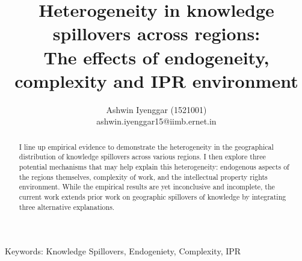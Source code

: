 \documentclass[12pt]{article}
\begin{document}
\title{\LARGE Heterogeneity in knowledge spillovers across regions:\\ \Large The effects of endogeneity,  complexity and IPR environment}
\author{Ashwin Iyenggar  (1521001) \\ ashwin.iyenggar15@iimb.ernet.in} 
\large

\maketitle
\thispagestyle{empty}

\begin{abstract}
\large \noindent I line up empirical evidence to demonstrate the heterogeneity in the geographical distribution of knowledge spillovers across various regions. I then explore  three potential mechanisms that may help explain this heterogeneity: endogenous aspects of the regions themselves, complexity of work, and the intellectual property rights environment. While the empirical results are yet inconclusive and incomplete, the current work extends prior work on geographic spillovers of knowledge by  integrating three alternative explanations.
\end{abstract}
{Keywords:} Knowledge Spillovers, Endogeniety, Complexity, IPR
\doublespacing
\end{document}
